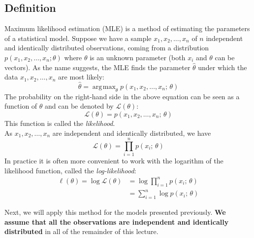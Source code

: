 \documentclass[12pt]{report}	%
\DeclareMathOperator*{\argmax}{\arg\!\max}
\begin{document}
\subsection{Definition}
Maximum likelihood estimation (MLE) is a method of estimating the parameters of a statistical model. Suppose we have a sample $x_1,x_2,\ldots,x_n$ of $n$ independent and identically distributed observations, coming from a distribution $p(x_1,x_2,\ldots,x_n;\theta)$ where $\theta$ is an unknown parameter (both $x_i$ and $\theta$ can be vectors). As the name suggests, the MLE finds the parameter $\hat{\theta}$ under which the data $x_1,x_2,\ldots,x_n$ are most likely:
\begin{equation}
\hat{\theta} = \argmax_\theta p(x_1,x_2,\ldots,x_n; \, \theta) 
\end{equation}
The probability on the right-hand side in the above equation can be seen as a function of $\theta$ and can be denoted by $\mathcal{L}(\theta)$:
\begin{equation}
\mathcal{L}(\theta) = p(x_1,x_2,\ldots,x_n; \, \theta) 
\end{equation}
This function is called the \textit{likelihood}.\\
As $x_1,x_2,\ldots,x_n$ are independent and identically distributed, we have
\begin{equation}
\mathcal{L}(\theta) = \prod_{i=1}^n p(x_i; \, \theta) 
\end{equation}
In practice it is often more convenient to work with the logarithm of the likelihood function, called the \textit{log-likelihood}:
\begin{align}
\ell(\theta) = \log\mathcal{L}(\theta) 	&= \log \prod_{i=1}^n p(x_i; \, \theta) \\ 
						&= \sum_{i=1}^n \log p(x_i; \, \theta) \label{eq:loglikelihood}
\end{align}

Next, we will apply this method for the models presented previously. \textbf{We assume that all the observations are independent and identically distributed} in all of the remainder of this lecture.
\end{document}
